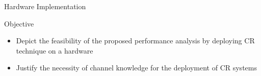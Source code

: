 \documentclass[16pt]{beamer}
\newcommand{\fs}[2]{\fontsize{#1 pt}{#2}\selectfont}
\begin{document}
\begin{frame}[t]{Hardware Implementation}
	\vspace{-3mm}
	\fs{7}{8}
	\begin{block}{\scriptsize Objective}
		\begin{itemize}
			\item Depict the feasibility of the proposed performance analysis by deploying CR technique on a hardware
			\item Justify the necessity of channel knowledge for the deployment of CR systems 
	
		\end{itemize}
	\end{block}
	\begin{columns}
		\begin{column}{0.45\columnwidth}
\end{column}
\end{columns}
\end{frame}
\end{document}
